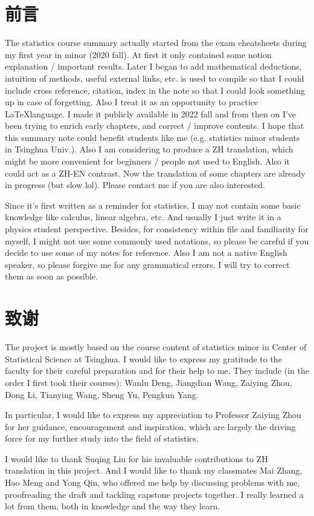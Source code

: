 {}
\chapter*{前言}


\qquad The statistics course summary actually started from the exam cheatsheets during my first year in minor (2020 fall). At first it only contained some notion explanation / important results. Later I began to add mathematical deductions, intuition of methods, useful external links, etc.  is used to compile so that I could include cross reference, citation, index in the note so that I could look something up in case of forgetting. Also I treat it as an opportunity to practice \LaTeX language. I made it publicly available in 2022 fall and from then on I've been trying to enrich early chapters, and correct / improve contents. I hope that this summary note could benefit students like me (e.g. statistics minor students in Tsinghua Univ.). Also I am considering to produce a ZH translation, which might be more convenient for beginners / people not used to English. Also it could act as a ZH-EN contrast. Now the translation of some chapters are already in progress (but slow lol). Please contact me if you are also interested.

Since it's first written as a reminder for statistics, I may not contain some basic knowledge like calculus, linear algebra, etc. And usually I just write it in a physics student perspective. Besides, for consistency within file and familiarity for myself, I might not use some commonly used notations, so please be careful if you decide to use some of my notes for reference. Also I am not a native English speaker, so please forgive me for any grammatical errors. I will try to correct them as soon as possible.


\chapter*{致谢}
{}

\qquad The project is mostly based on the course content of statistics minor in Center of Statistical Science at Tsinghua. I would like to express my gratitude to the faculty for their careful preparation and for their help to me. They include (in the order I first took their courses): Wanlu Deng, Jiangdian Wang, Zaiying Zhou, Dong Li, Tianying Wang, Sheng Yu, Pengkun Yang.

In particular, I would like to express my appreciation to Professor Zaiying Zhou for her guidance, encouragement and inspiration, which are largely the driving force for my further study into the field of statistics.

I would like to thank Suqing Liu for his invaluable contributions to ZH translation in this project. And I would like to thank my classmates Mai Zhang, Hao Meng and Yong Qin, who offered me help by discussing problems with me, proofreading the draft and tackling capstone projects together. I really learned a lot from them, both in knowledge and the way they learn.


